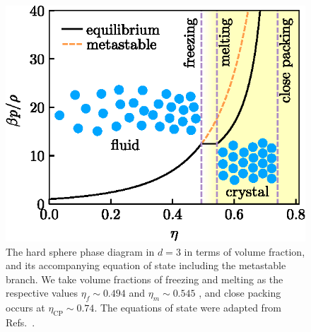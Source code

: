 \documentclass[11pt,twoside]{report}
\begin{document}
\begin{figure}
  \includegraphics[width=0.85\linewidth,outer]{hs-phase-diagram}
  \caption[The hard sphere phase diagram]{
    The hard sphere phase diagram in $d=3$ in terms of volume fraction, and its accompanying equation of state including the metastable branch.
    We take volume fractions of freezing and melting as the respective values $\eta_f \sim 0.494$ and $\eta_m \sim 0.545$ \cite{HooverJCP1968}, and close packing occurs at $\eta_\mathrm{CP} \sim 0.74$.
    The equations of state were adapted from Refs.\ \cite{CarnahanJCP1969,SpeedyJPCM1998,BannermanJCP2010}.
  }
  \label{fig:hs-phase-diagram}
\end{figure}
\end{document}

